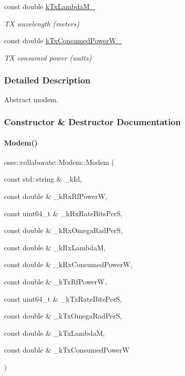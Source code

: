 \begin{DoxyCompactItemize}
const double \hyperlink{classosse_1_1collaborate_1_1_modem_a6f37bdb3320f282c58c32371799c6c43}{k\+Tx\+Lambda\+M\+\_\+}
\begin{DoxyCompactList}\small\item\em TX wavelength (meters) \end{DoxyCompactList}\item 
\mbox{\label{classosse_1_1collaborate_1_1_modem_ac02f253ef6149907fd61b1f5cdbf4590}} 
const double \hyperlink{classosse_1_1collaborate_1_1_modem_ac02f253ef6149907fd61b1f5cdbf4590}{k\+Tx\+Consumed\+Power\+W\+\_\+}
\begin{DoxyCompactList}\small\item\em TX consumed power (watts) \end{DoxyCompactList}\end{DoxyCompactItemize}


\subsubsection{Detailed Description}
Abstract modem. 

\subsubsection{Constructor \& Destructor Documentation}
\mbox{\label{classosse_1_1collaborate_1_1_modem_ade030a147d5bc9aaf4a0b615c1cea84a}} 
\paragraph{\texorpdfstring{Modem()}{Modem()}}
{\footnotesize\ttfamily osse\+::collaborate\+::\+Modem\+::\+Modem (\begin{DoxyParamCaption}\item[{const std\+::string \&}]{\+\_\+k\+Id,  }\item[{const double \&}]{\+\_\+k\+Rx\+Rf\+PowerW,  }\item[{const uint64\+\_\+t \&}]{\+\_\+k\+Rx\+Rate\+Bits\+PerS,  }\item[{const double \&}]{\+\_\+k\+Rx\+Omega\+Rad\+PerS,  }\item[{const double \&}]{\+\_\+k\+Rx\+LambdaM,  }\item[{const double \&}]{\+\_\+k\+Rx\+Consumed\+PowerW,  }\item[{const double \&}]{\+\_\+k\+Tx\+Rf\+PowerW,  }\item[{const uint64\+\_\+t \&}]{\+\_\+k\+Tx\+Rate\+Bits\+PerS,  }\item[{const double \&}]{\+\_\+k\+Tx\+Omega\+Rad\+PerS,  }\item[{const double \&}]{\+\_\+k\+Tx\+LambdaM,  }\item[{const double \&}]{\+\_\+k\+Tx\+Consumed\+PowerW }\end{DoxyParamCaption})}



